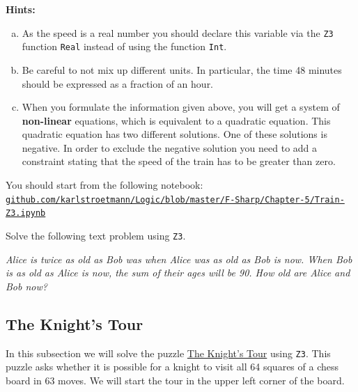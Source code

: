 \noindent
\textbf{Hints:}
\begin{enumerate}[(a)]
\item As the speed is a real number you should declare this variable via the \texttt{Z3} function \texttt{Real} instead of using
      the function \texttt{Int}.
\item Be careful to not mix up different units. In particular, the time 48 minutes should be expressed as a
      fraction of an hour.
\item When you formulate the information given above, you will get a system of \textbf{non-linear} equations,
      which is equivalent to a quadratic equation.  This quadratic equation has two different solutions.
      One of these solutions is negative.  In order to exclude the negative solution you need to add a
      constraint stating that the speed of the train has to be greater than zero.
\end{enumerate}
You should start from the following notebook:
\\[0.2cm]
\hspace*{0.8cm}
\href{https://github.com/karlstroetmann/Logic/blob/master/F-Sharp/Chapter-5/Train-Z3.ipynb}{\texttt{github.com/karlstroetmann/Logic/blob/master/F-Sharp/Chapter-5/Train-Z3.ipynb}}
\eox

\exerciseEng
Solve the following text problem using \texttt{Z3}.

\begin{minipage}[b]{0.9\linewidth}
\textsl{Alice is twice as old as Bob was when Alice was as old as Bob is now. When Bob is as old as Alice is now, the sum of their ages will be 90. How old are Alice and Bob now?}
\end{minipage} 
\eox

\subsection{The Knight's Tour}
In this subsection we will solve the puzzle \href{https://en.wikipedia.org/wiki/Knight%27s_tour}{The Knight's Tour} 
using \texttt{Z3}.  This puzzle asks whether it is possible for a knight to visit all 64 squares of a chess board
in 63 moves.  We will start the tour in the upper left corner of the board.  

